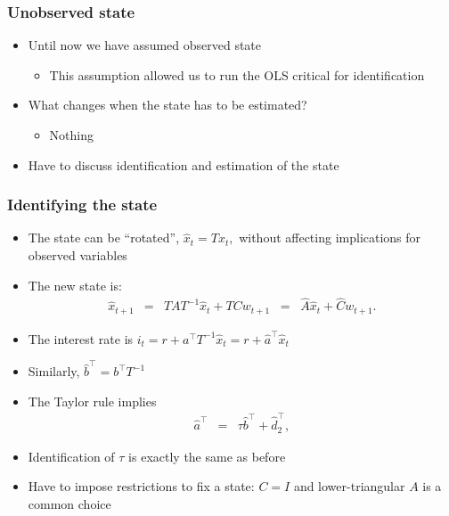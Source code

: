 \documentclass[handout]{beamer}
\begin{document}
\begin{frame}
\frametitle{Unobserved state}

\begin{itemize} \itemsep=\bigskipamount
    \item Until now we have assumed observed state
        \begin{itemize}
            \item This assumption allowed us to run the OLS critical for identification
        \end{itemize}
      \item What changes when the state has to be estimated?
        \begin{itemize}
            \item Nothing
        \end{itemize}
        \item Have to discuss identification and estimation of the state
\end{itemize}

\end{frame}

\begin{frame}
\frametitle{Identifying the state}

\begin{itemize} %
    \item The state can be ``rotated'', $\hat{x}_t = T x_t,$ without affecting implications for observed variables
    \item The new state is:
    \begin{eqnarray*}
    \hat{x}_{t+1} &=& T A T^{-1} \hat{x}_t + T C w_{t+1}
            \;\;=\;\; \hat{A} \hat{x}_t + \hat{C} w_{t+1} .
\end{eqnarray*}
   \item The interest rate is $ i_t =r+a^\top T^{-1} \hat{x}_t = r + \hat{a}^{\top} \hat{x}_t$
   \item Similarly, $ \hat{b}^{\top} = b^\top T^{-1}$
   \item The Taylor rule  implies
\begin{eqnarray*}
    \hat{a}^{\top} &=& \tau \hat{b}^{\top} + \hat{d}^{\top}_2 ,
\end{eqnarray*}
  \item Identification of $\tau$ is exactly the same as before
\item Have to impose restrictions to fix a state: $C=I$ and lower-triangular $A$ is a common choice
\end{itemize}

\end{frame}
\end{document}
